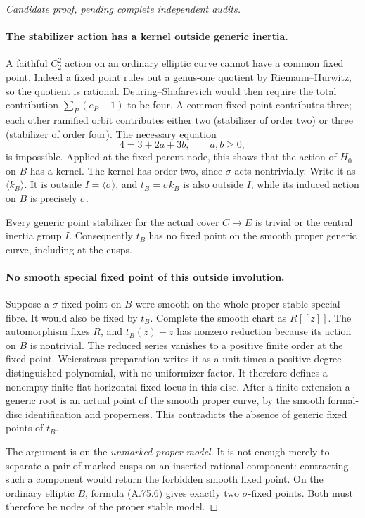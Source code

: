 \begin{proof}[Candidate proof, pending complete independent audits]
\paragraph{The stabilizer action has a kernel outside generic inertia.}
A faithful \(C_2^2\) action on an ordinary elliptic curve
cannot have a common fixed point. Indeed a fixed point
rules out a genus-one quotient by Riemann--Hurwitz, so
the quotient is rational. Deuring--Shafarevich would then
require the total contribution \(\sum_P(e_P-1)\) to
be four. A common fixed point contributes three; each
other ramified orbit contributes either two (stabilizer
of order two) or three (stabilizer of order four). The
necessary equation
\[
                         4=3+2a+3b,\qquad a,b\ge0,
                                                        \tag{A.75.9}
\]
is impossible. Applied at the fixed parent node, this
shows that the action of \(H_0\) on \(B\) has a kernel.
The kernel has order two, since \(\sigma\) acts
nontrivially. Write it as \(\langle k_B\rangle\).
It is outside \(I=\langle\sigma\rangle\), and
\(t_B=\sigma k_B\) is also outside \(I\), while its
induced action on \(B\) is precisely \(\sigma\).

Every generic point stabilizer for the actual cover
\(C\to E\) is trivial or the central inertia group \(I\).
Consequently \(t_B\) has no fixed point on the smooth
proper generic curve, including at the cusps.

\paragraph{No smooth special fixed point of this outside involution.}
Suppose a \(\sigma\)-fixed point on \(B\) were smooth
on the whole proper stable special fibre. It would also
be fixed by \(t_B\). Complete the smooth chart as
\(R[[z]]\). The automorphism fixes \(R\), and
\(t_B(z)-z\) has nonzero reduction because its action
on \(B\) is nontrivial. The reduced series vanishes to
a positive finite order at the fixed point. Weierstrass
preparation writes it as a unit times a positive-degree
distinguished polynomial, with no uniformizer factor.
It therefore defines a nonempty finite flat horizontal
fixed locus in this disc.
\cite[Corollary 2.16]{fghVonk2021}
After a finite extension a generic root is an actual
point of the smooth proper curve, by the smooth formal-disc
identification and properness. This contradicts the absence
of generic fixed points of \(t_B\).

The argument is on the \emph{unmarked proper model}.
It is not enough merely to separate a pair of marked
cusps on an inserted rational component: contracting such
a component would return the forbidden smooth fixed point.
On the ordinary elliptic \(B\), formula (A.75.6) gives
exactly two \(\sigma\)-fixed points. Both must therefore
be nodes of the proper stable model.


\end{proof}
